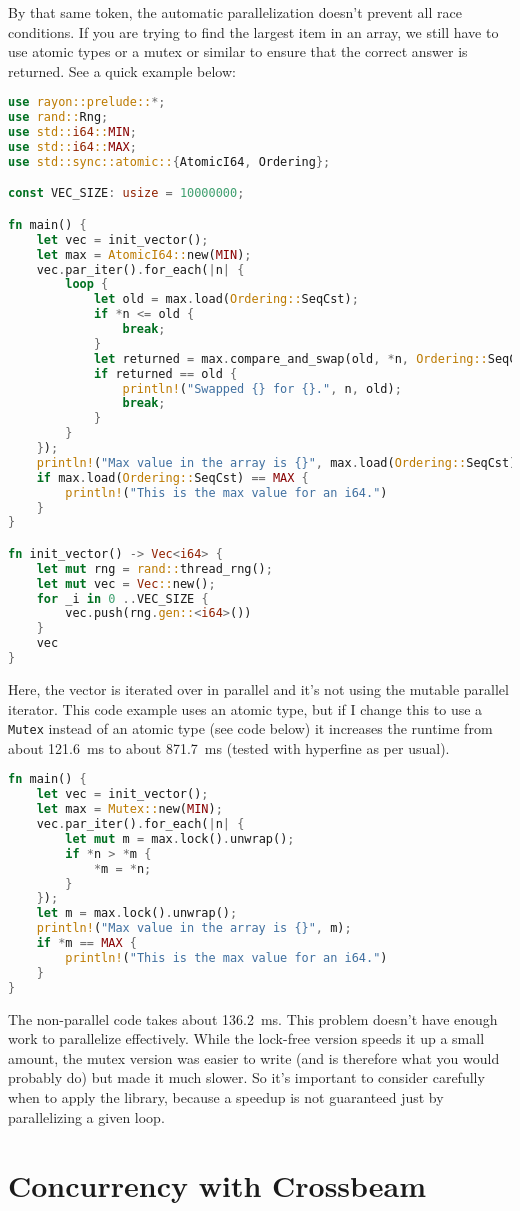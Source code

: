 By that same token, the automatic parallelization doesn't prevent all race conditions. If you are trying to find the largest item in an array, we still have to use atomic types or a mutex or similar to ensure that the correct answer is returned. See a quick example below:

\begin{lstlisting}[language=Rust]
use rayon::prelude::*;
use rand::Rng;
use std::i64::MIN;
use std::i64::MAX;
use std::sync::atomic::{AtomicI64, Ordering};

const VEC_SIZE: usize = 10000000;

fn main() {
    let vec = init_vector();
    let max = AtomicI64::new(MIN);
    vec.par_iter().for_each(|n| {
        loop {
            let old = max.load(Ordering::SeqCst);
            if *n <= old {
                break;
            }
            let returned = max.compare_and_swap(old, *n, Ordering::SeqCst);
            if returned == old {
                println!("Swapped {} for {}.", n, old);
                break;
            }
        }
    });
    println!("Max value in the array is {}", max.load(Ordering::SeqCst));
    if max.load(Ordering::SeqCst) == MAX {
        println!("This is the max value for an i64.")
    }
}

fn init_vector() -> Vec<i64> {
    let mut rng = rand::thread_rng();
    let mut vec = Vec::new();
    for _i in 0 ..VEC_SIZE {
        vec.push(rng.gen::<i64>())
    }
    vec
}
\end{lstlisting}

Here, the vector is iterated over in parallel and it's not using the mutable parallel iterator. This code example uses an atomic type, but if I change this to use a \texttt{Mutex} instead of an atomic type (see code below) it increases the runtime from about 121.6~ms to about 871.7~ms (tested with hyperfine as per usual).

\begin{lstlisting}[language=Rust]
fn main() {
    let vec = init_vector();
    let max = Mutex::new(MIN);
    vec.par_iter().for_each(|n| {
        let mut m = max.lock().unwrap();
        if *n > *m {
            *m = *n;
        }
    });
    let m = max.lock().unwrap();
    println!("Max value in the array is {}", m);
    if *m == MAX {
        println!("This is the max value for an i64.")
    }
}
\end{lstlisting}

 The non-parallel code takes about 136.2~ms. This problem doesn't have enough work to parallelize effectively. While the lock-free version speeds it up a small amount, the mutex version was easier to write (and is therefore what you would probably do) but made it much slower. So it's important to consider carefully when to apply the library, because a speedup is not guaranteed just by parallelizing a given loop.



\section*{Concurrency with Crossbeam} 




